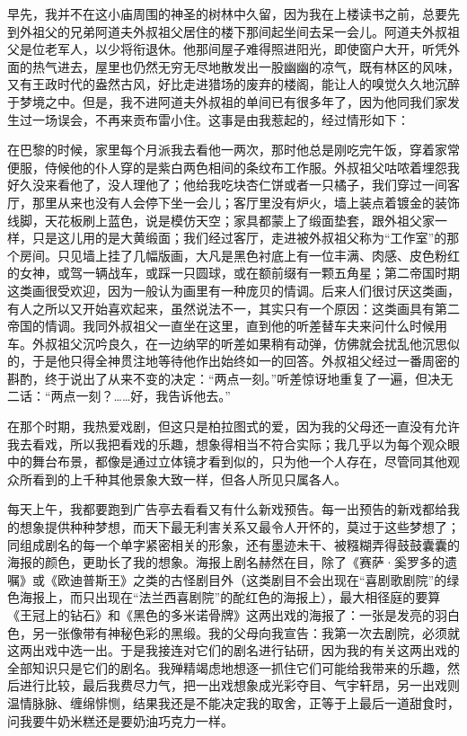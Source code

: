 \par 早先，我并不在这小庙周围的神圣的树林中久留，因为我在上楼读书之前，总要先到外祖父的兄弟阿道夫外叔祖父居住的楼下那间起坐间去呆一会儿。阿道夫外叔祖父是位老军人，以少将衔退休。他那间屋子难得照进阳光，即使窗户大开，听凭外面的热气进去，屋里也仍然无穷无尽地散发出一股幽幽的凉气，既有林区的风味，又有王政时代的盎然古风，好比走进猎场的废弃的楼阁，能让人的嗅觉久久地沉醉于梦境之中。但是，我不进阿道夫外叔祖的单间已有很多年了，因为他同我们家发生过一场误会，不再来贡布雷小住。这事是由我惹起的，经过情形如下：
\par 在巴黎的时候，家里每个月派我去看他一两次，那时他总是刚吃完午饭，穿着家常便服，侍候他的仆人穿的是紫白两色相间的条纹布工作服。外叔祖父咕哝着埋怨我好久没来看他了，没人理他了；他给我吃块杏仁饼或者一只橘子，我们穿过一间客厅，那里从来也没有人会停下坐一会儿；客厅里没有炉火，墙上装点着镀金的装饰线脚，天花板刷上蓝色，说是模仿天空；家具都蒙上了缎面垫套，跟外祖父家一样，只是这儿用的是大黄缎面；我们经过客厅，走进被外叔祖父称为“工作室”的那个房间。只见墙上挂了几幅版画，大凡是黑色衬底上有一位丰满、肉感、皮色粉红的女神，或驾一辆战车，或踩一只圆球，或在额前缀有一颗五角星；第二帝国时期这类画很受欢迎，因为一般认为画里有一种庞贝的情调。后来人们很讨厌这类画，有人之所以又开始喜欢起来，虽然说法不一，其实只有一个原因：这类画具有第二帝国的情调。我同外叔祖父一直坐在这里，直到他的听差替车夫来问什么时候用车。外叔祖父沉吟良久，在一边纳罕的听差如果稍有动弹，仿佛就会扰乱他沉思似的，于是他只得全神贯注地等待他作出始终如一的回答。外叔祖父经过一番周密的斟酌，终于说出了从来不变的决定：“两点一刻。”听差惊讶地重复了一遍，但决无二话：“两点一刻？……好，我告诉他去。”
\par 在那个时期，我热爱戏剧，但这只是柏拉图式的爱，因为我的父母还一直没有允许我去看戏，所以我把看戏的乐趣，想象得相当不符合实际；我几乎以为每个观众眼中的舞台布景，都像是通过立体镜才看到似的，只为他一个人存在，尽管同其他观众所看到的上千种其他景象大致一样，但各人所见只属各人。
\par 每天上午，我都要跑到广告亭去看看又有什么新戏预告。每一出预告的新戏都给我的想象提供种种梦想，而天下最无利害关系又最令人开怀的，莫过于这些梦想了；同组成剧名的每一个单字紧密相关的形象，还有墨迹未干、被糨糊弄得鼓鼓囊囊的海报的颜色，更助长了我的想象。海报上剧名赫然在目，除了《赛萨·奚罗多的遗嘱》或《欧迪普斯王》之类的古怪剧目外（这类剧目不会出现在“喜剧歌剧院”的绿色海报上，而只出现在“法兰西喜剧院”的酡红色的海报上），最大相径庭的要算《王冠上的钻石》和《黑色的多米诺骨牌》这两出戏的海报了：一张是发亮的羽白色，另一张像带有神秘色彩的黑缎。我的父母向我宣告：我第一次去剧院，必须就这两出戏中选一出。于是我接连对它们的剧名进行钻研，因为我的有关这两出戏的全部知识只是它们的剧名。我殚精竭虑地想逐一抓住它们可能给我带来的乐趣，然后进行比较，最后我费尽力气，把一出戏想象成光彩夺目、气宇轩昂，另一出戏则温情脉脉、缠绵悱恻，结果我还是不能决定我的取舍，正等于上最后一道甜食时，问我要牛奶米糕还是要奶油巧克力一样。
